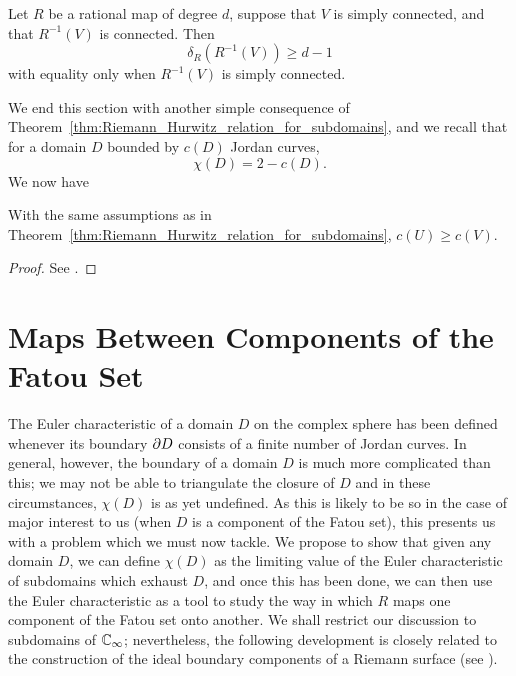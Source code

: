 \begin{corollary}
    Let $R$ be a rational map of degree $d$, suppose that $V$ is simply
    connected, and that $R^{-1}(V)$ is connected. Then
    \begin{equation*}
        \delta_R(R^{-1}(V)) \geq d-1
    \end{equation*}
    with equality only when $R^{-1}(V)$ is simply connected.
\end{corollary}

We end this section with another simple consequence of
Theorem~\ref{thm:Riemann_Hurwitz_relation_for_subdomains}, and we recall that
for a domain $D$ bounded by $c(D)$ Jordan curves,
\begin{equation}
    \label{eq:Eulers_characteristic_formula_for_bounded_domains_via_connectivity}
    \chi(D) = 2 - c(D).
\end{equation}
We now have

\begin{proposition}[$c(U) \geq c(V)$]
    With the same assumptions as in
    Theorem~\ref{thm:Riemann_Hurwitz_relation_for_subdomains}, $c(U) \geq c(V)$.
\end{proposition}
\begin{proof}
    See \cite[89]{Beardon1991}.
\end{proof}

\section{Maps Between Components of the Fatou Set}
\label{sec:maps_between_components_of_the_Fatou_set}

The Euler characteristic of a domain $D$ on the complex sphere has been defined
whenever its boundary $\partial {D}$ consists of a finite number of Jordan
curves. In general, however, the boundary of a domain $D$ is much more
complicated than this; we may not be able to triangulate the closure of $D$ and
in these circumstances, $\chi(D)$ is as yet undefined. As this is likely to be
so in the case of major interest to us (when $D$ is a component of the Fatou
set), this presents us with a problem which we must now tackle. We propose to
show that given any domain $D$, we can define $\chi(D)$ as the limiting value of
the Euler characteristic of subdomains which exhaust $D$, and once this has been
done, we can then use the Euler characteristic as a tool to study the way in
which $R$ maps one component of the Fatou set onto another. We shall restrict
our discussion to subdomains of $\mathbb{C}_\infty$; nevertheless, the following development
is closely related to the construction of the ideal boundary components of a
Riemann surface (see \cite[25--26, 81--87]{Ahlfors1960}).

